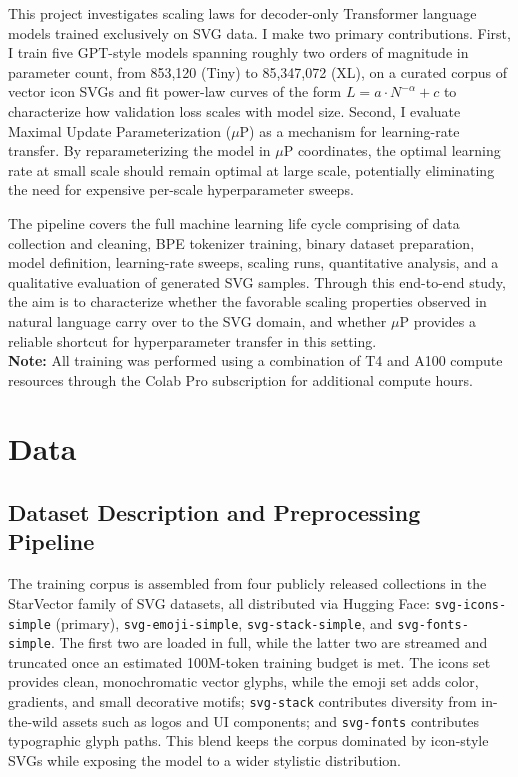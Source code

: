 \documentclass[a4paper]{article}
\begin{document}
This project investigates scaling laws for decoder-only Transformer language models trained exclusively on SVG data. I make two primary contributions. First, I train five GPT-style models spanning roughly two orders of magnitude in parameter count, from 853,120 (Tiny) to 85,347,072 (XL), on a curated corpus of vector icon SVGs and fit power-law curves of the form $L = a \cdot N^{-\alpha} + c$ to characterize how validation loss scales with model size. Second, I evaluate Maximal Update Parameterization ($\mu$P)\cite{4} as a mechanism for learning-rate transfer. By reparameterizing the model in $\mu$P coordinates, the optimal learning rate at small scale should remain optimal at large scale, potentially eliminating the need for expensive per-scale hyperparameter sweeps.
\vspace{1pt}

The pipeline covers the full machine learning life cycle comprising of data collection and cleaning, BPE tokenizer training, binary dataset preparation, model definition, learning-rate sweeps, scaling runs, quantitative analysis, and a qualitative evaluation of generated SVG samples. Through this end-to-end study, the aim is to characterize whether the favorable scaling properties observed in natural language carry over to the SVG domain, and whether $\mu$P provides a reliable shortcut for hyperparameter transfer in this setting.
\\

\textbf{Note: }All training was performed using a combination of T4 and A100 compute resources through the Colab Pro subscription for additional compute hours.
\section{Data}

\subsection{Dataset Description and Preprocessing Pipeline}

The training corpus is assembled from four publicly released collections in the StarVector \cite{4} family of SVG datasets, all distributed via Hugging Face: \texttt{svg-icons-simple} (primary), \texttt{svg-emoji-simple}, \texttt{svg-stack-simple}, and \texttt{svg-fonts-simple}. The first two are loaded in full, while the latter two are streamed and truncated once an estimated 100M-token training budget is met. The icons set provides clean, monochromatic vector glyphs, while the emoji set adds color, gradients, and small decorative motifs; \texttt{svg-stack} contributes diversity from in-the-wild assets such as logos and UI components; and \texttt{svg-fonts} contributes typographic glyph paths. This blend keeps the corpus dominated by icon-style SVGs while exposing the model to a wider stylistic distribution.
\vspace{4pt}
\end{document}
